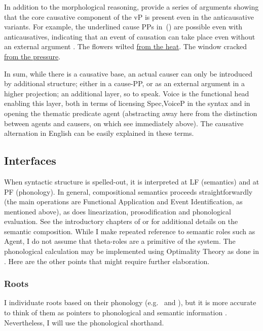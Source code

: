 In addition to the morphological reasoning, \cite{layering15} provide a series of arguments showing that the core causative component of the vP is present even in the anticausative variants. For example, the underlined cause PPs in~(\nextx) are possible even with anticausatives, indicating that an event of causation can take place even without an external argument \citep{alexiadouetal06,alexiadouetal06nels}.
\pex
	\a The flowers wilted \underline{from the heat}.
	\a The window cracked \underline{from the pressure}.
\xe

In sum, while there is a causative base, an actual causer can only be introduced by additional structure; either in a cause-PP, or as an external argument in a higher projection; an additional layer, so to speak. Voice is the functional head enabling this layer, both in terms of licensing Spec,VoiceP in the syntax and in opening the thematic predicate agent (abstracting away here from the distinction between agents and causers, on which see immediately above). The causative alternation in English can be easily explained in these terms.

	\subsection{Interfaces}
When syntactic structure is spelled-out, it is interpreted at LF (semantics) and at PF (phonology). In general, compositional semantics proceeds straightforwardly (the main operations are Functional Application and Event Identification, as mentioned above), as does linearization, prosodification and phonological evaluation. See the introductory chapters of \cite{wood15springer} or \cite{myler16mit} for additional details on the semantic composition. While I make repeated reference to semantic roles such as Agent, I do not assume that theta-roles are a primitive of the system. The phonological calculation may be implemented using Optimality Theory \citep{ot} as done in \cite{kastner18nllt}. Here are the other points that might require further elaboration.

		\subsubsection{Roots}
I individuate roots based on their phonology (e.g.~ and ), but it is more accurate to think of them as pointers to phonological and semantic information \citep{harley14thlia,faust16,kastner18nllt}. Nevertheless, I will use the phonological shorthand.

